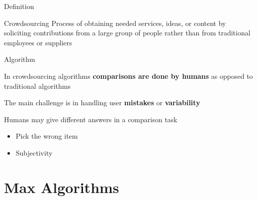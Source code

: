 \documentclass{beamer}
\begin{document}
\begin{frame}{Definition}
	\begin{block}{Crowdsourcing}
		Process of obtaining needed services, ideas, or content by soliciting contributions from a large group of people
		rather than from 	traditional employees or suppliers
 		
 		
	\end{block}
\end{frame}

\begin{frame}{Algorithm}
		\begin{block}{}
			In crowdsourcing algorithms \textbf{\color{beaver_red}
			comparisons are done by humans} as opposed to traditional algorithms
		\end{block}
		\pause		
		\vspace{5pt}
		\begin{block}{}
				The main challenge is in handling user \textbf{\color{beaver_red}mistakes} or \textbf{\color{beaver_red}variability}
		\end{block}
		\pause
		\vspace{10pt}
		Humans may give different answers in a comparison task
			\begin{itemize}
				\item Pick the wrong item
				\item Subjectivity %
			\end{itemize}
\end{frame}

\section{Max Algorithms}
\begin{frame}
\end{frame}
\end{document}
